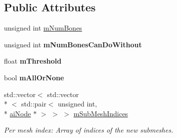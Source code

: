 \subsection*{Public Attributes}
\begin{DoxyCompactItemize}
\item 
unsigned int \hyperlink{class_assimp_1_1_debone_process_ac3ceaa3933abbec1d5692e03e42aa057}{m\+Num\+Bones}
\item 
\hypertarget{class_assimp_1_1_debone_process_a245ba16784465cd9dbf5480818e2a526}{unsigned int {\bfseries m\+Num\+Bones\+Can\+Do\+Without}}\label{class_assimp_1_1_debone_process_a245ba16784465cd9dbf5480818e2a526}

\item 
\hypertarget{class_assimp_1_1_debone_process_a11206b571174137d70e6096c33465dd7}{float {\bfseries m\+Threshold}}\label{class_assimp_1_1_debone_process_a11206b571174137d70e6096c33465dd7}

\item 
\hypertarget{class_assimp_1_1_debone_process_ac98ed87f642ff9b936fed474408a2833}{bool {\bfseries m\+All\+Or\+None}}\label{class_assimp_1_1_debone_process_ac98ed87f642ff9b936fed474408a2833}

\item 
\hypertarget{class_assimp_1_1_debone_process_ad1d5ade5db978ee44a7ead3388ac03f3}{std\+::vector$<$ std\+::vector\\*
$<$ std\+::pair$<$ unsigned int, \\*
\hyperlink{structai_node}{ai\+Node} $\ast$ $>$ $>$ $>$ \hyperlink{class_assimp_1_1_debone_process_ad1d5ade5db978ee44a7ead3388ac03f3}{m\+Sub\+Mesh\+Indices}}\label{class_assimp_1_1_debone_process_ad1d5ade5db978ee44a7ead3388ac03f3}

\begin{DoxyCompactList}\small\item\em Per mesh index\+: Array of indices of the new submeshes. \end{DoxyCompactList}\end{DoxyCompactItemize}
